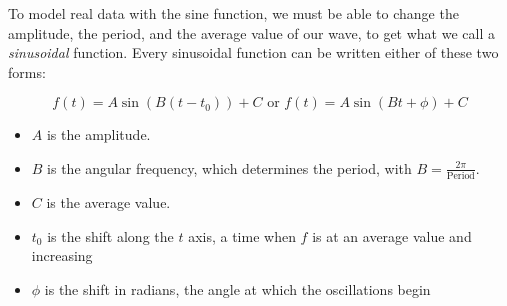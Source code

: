 To model real data with the sine function, we must be able to change the amplitude, the
period, and the average value of our wave, to get what we call a \emph{sinusoidal}
function.  Every sinusoidal function can be written either of these two forms:

\begin{callout}
    \[ f(t) = A \sin( B ( t - t_0) ) + C \mbox{ or } f(t) = A \sin( B t + \phi) + C \]

\begin{itemize}
\item $A$ is the amplitude.  
\item $B$ is the angular frequency, which determines the period, with $B = \frac{2 \pi}{\mbox{Period}}$.  
\item $C$ is the average value.  
\item $t_0$ is the shift along the $t$ axis, a time when $f$ is at an average value and increasing
\item $\phi$ is the shift in radians, the angle at which the oscillations begin
\end{itemize}
\end{callout}

